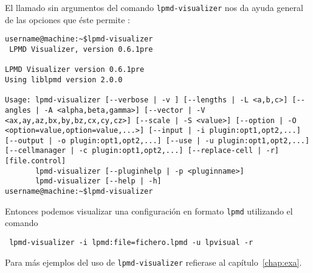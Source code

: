 El llamado sin argumentos del comando \verb|lpmd-visualizer| nos da ayuda general de las opciones que \'este permite :

\begin{verbatim}
username@machine:~$lpmd-visualizer
 LPMD Visualizer, version 0.6.1pre

LPMD Visualizer version 0.6.1pre
Using liblpmd version 2.0.0

Usage: lpmd-visualizer [--verbose | -v ] [--lengths | -L <a,b,c>] [--angles | -A <alpha,beta,gamma>] [--vector | -V <ax,ay,az,bx,by,bz,cx,cy,cz>] [--scale | -S <value>] [--option | -O <option=value,option=value,...>] [--input | -i plugin:opt1,opt2,...] [--output | -o plugin:opt1,opt2,...] [--use | -u plugin:opt1,opt2,...] [--cellmanager | -c plugin:opt1,opt2,...] [--replace-cell | -r] [file.control]
       lpmd-visualizer [--pluginhelp | -p <pluginname>]
       lpmd-visualizer [--help | -h]
username@machine:~$lpmd-visualizer
\end{verbatim}

Entonces podemos visualizar una configuraci\'on en formato \verb|lpmd| utilizando el comando

\begin{verbatim}
 lpmd-visualizer -i lpmd:file=fichero.lpmd -u lpvisual -r
\end{verbatim}

Para m\'as ejemplos del uso de \verb|lpmd-visualizer| refierase al cap\'itulo~\ref{chap:exa}.
